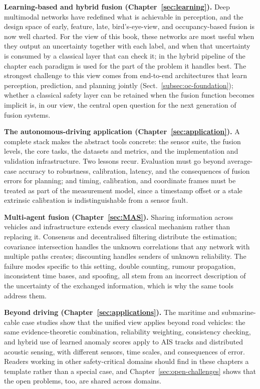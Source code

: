 \documentclass[graybox,envcountchap]{style/SNmono}
\begin{document}
\textbf{Learning-based and hybrid fusion (Chapter~\ref{sec:learning}).} Deep multimodal networks have redefined what is achievable in perception, and the design space of early, feature, late, bird's-eye-view, and occupancy-based fusion is now well charted. For the view of this book, these networks are most useful when they output an uncertainty together with each label, and when that uncertainty is consumed by a classical layer that can check it; in the hybrid pipeline of the chapter each paradigm is used for the part of the problem it handles best. The strongest challenge to this view comes from end-to-end architectures that learn perception, prediction, and planning jointly (Sect.~\ref{subsec:oc-foundation}); whether a classical safety layer can be retained when the fusion function becomes implicit is, in our view, the central open question for the next generation of fusion systems.

\textbf{The autonomous-driving application (Chapter~\ref{sec:application}).} A complete stack makes the abstract tools concrete: the sensor suite, the fusion levels, the core tasks, the datasets and metrics, and the implementation and validation infrastructure. Two lessons recur. Evaluation must go beyond average-case accuracy to robustness, calibration, latency, and the consequences of fusion errors for planning; and timing, calibration, and coordinate frames must be treated as part of the measurement model, since a timestamp offset or a stale extrinsic calibration is indistinguishable from a sensor fault.

\textbf{Multi-agent fusion (Chapter~\ref{sec:MAS}).} Sharing information across vehicles and infrastructure extends every classical mechanism rather than replacing it. Consensus and decentralised filtering distribute the estimation; covariance intersection handles the unknown correlations that any network with multiple paths creates; discounting handles senders of unknown reliability. The failure modes specific to this setting, double counting, rumour propagation, inconsistent time bases, and spoofing, all stem from an incorrect description of the uncertainty of the exchanged information, which is why the same tools address them.

\textbf{Beyond driving (Chapter~\ref{sec:applications}).} The maritime and submarine-cable case studies show that the unified view applies beyond road vehicles: the same evidence-theoretic combination, reliability weighting, consistency checking, and hybrid use of learned anomaly scores apply to AIS tracks and distributed acoustic sensing, with different sensors, time scales, and consequences of error. Readers working in other safety-critical domains should find in these chapters a template rather than a special case, and Chapter~\ref{sec:open-challenges} shows that the open problems, too, are shared across domains.
\end{document}
